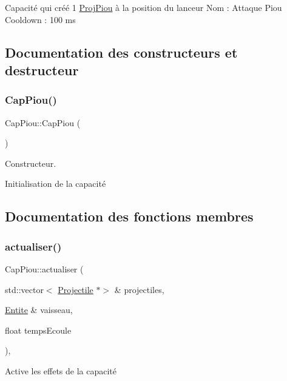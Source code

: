 Capacité qui créé 1 \hyperlink{class_proj_piou}{Proj\+Piou} à la position du lanceur Nom \+: Attaque Piou Cooldown \+: 100 ms 

\subsection{Documentation des constructeurs et destructeur}
\mbox{\label{class_cap_piou_aa2ed61fb1313a447cf8444399001750d}} 
\subsubsection{\texorpdfstring{Cap\+Piou()}{CapPiou()}}
{\footnotesize\ttfamily Cap\+Piou\+::\+Cap\+Piou (\begin{DoxyParamCaption}{ }\end{DoxyParamCaption})}



Constructeur. 

Initialisation de la capacité 

\subsection{Documentation des fonctions membres}
\mbox{\label{class_cap_piou_a0823f301d48377ca2e14a0cd17922716}} 
\subsubsection{\texorpdfstring{actualiser()}{actualiser()}}
{\footnotesize\ttfamily Cap\+Piou\+::actualiser (\begin{DoxyParamCaption}\item[{std\+::vector$<$ \hyperlink{class_projectile}{Projectile} $\ast$$>$ \&}]{projectiles,  }\item[{\hyperlink{class_entite}{Entite} \&}]{vaisseau,  }\item[{float}]{temps\+Ecoule }\end{DoxyParamCaption})\hspace{0.3cm}{\ttfamily [override]}, {\ttfamily [virtual]}}



Active les effets de la capacité 

